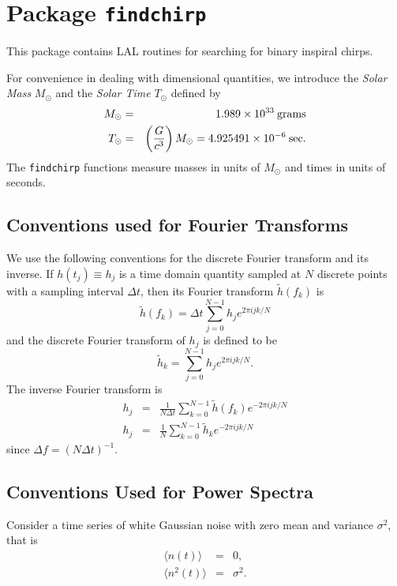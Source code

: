 \chapter{Package \texttt{findchirp}}

This package contains LAL routines for searching for binary inspiral chirps.

For convenience in dealing with dimensional quantities, we introduce
the {\it Solar Mass} $M_\odot$ and the {\it Solar Time} $T_\odot$
defined by
\begin{eqnarray}
M_\odot &=& 1.989 \times 10^{33} \> {\rm grams}\\
T_\odot &=& \left( {G \over c^3} \right) M_\odot = 4.925491 \times
10^{-6} \> {\rm sec}.
\end{eqnarray}
The \verb|findchirp| functions measure masses in units of $M_\odot$ 
and times in units of seconds.

\section{Conventions used for Fourier Transforms}

We use the following conventions for the discrete Fourier transform and 
its inverse. If $h(t_j) \equiv h_j$ is a time domain quantity sampled at
$N$ discrete points with a sampling interval $\Delta t$, then its Fourier 
transform $\tilde{h}(f_k)$ is
\begin{equation}
\tilde{h}(f_k) = \Delta t \sum_{j=0}^{N-1} h_j e^{2\pi ijk/N}
\end{equation}
and the discrete Fourier transform of $h_j$ is defined to be
\begin{equation}
\tilde{h}_k = \sum_{j=0}^{N-1} h_j e^{2\pi ijk/N}.
\end{equation}
The inverse Fourier transform is 
\begin{eqnarray}
\nonumber
h_j &=& \frac{1}{N\Delta t} \sum_{k=0}^{N-1} \tilde{h}(f_k) e^{-2\pi ijk/N} \\
h_j &=& \frac{1}{N} \sum_{k=0}^{N-1} \tilde{h}_k e^{-2\pi ijk/N}
\end{eqnarray}
since $\Delta f = (N\Delta t)^{-1}$.

\section{Conventions Used for Power Spectra}

Consider a time series of white Gaussian noise with zero mean and variance
$\sigma^2$, that is
\begin{eqnarray}
\nonumber
\langle n(t) \rangle &=& 0, \\
\langle n^2(t) \rangle &=& \sigma^2. \\
\end{eqnarray}

